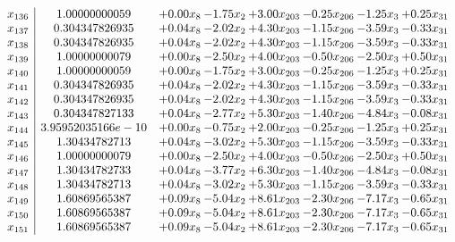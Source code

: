 \documentclass[8pt]{article}
\begin{document}
\[\begin{array}{c| c c@{\hskip 2pt} c@{\hskip 2pt} c@{\hskip 2pt} c@{\hskip 2pt} c@{\hskip 2pt} c@{\hskip 2pt} }
 x_{136}   &  1.00000000059 & +  0.00 x_{8} & -1.75 x_{2} & +  3.00 x_{203} & -0.25 x_{206} & -1.25 x_{3} & +  0.25 x_{31}\\
 x_{137}   &  0.304347826935 & +  0.04 x_{8} & -2.02 x_{2} & +  4.30 x_{203} & -1.15 x_{206} & -3.59 x_{3} & -0.33 x_{31}\\
 x_{138}   &  0.304347826935 & +  0.04 x_{8} & -2.02 x_{2} & +  4.30 x_{203} & -1.15 x_{206} & -3.59 x_{3} & -0.33 x_{31}\\
 x_{139}   &  1.00000000079 & +  0.00 x_{8} & -2.50 x_{2} & +  4.00 x_{203} & -0.50 x_{206} & -2.50 x_{3} & +  0.50 x_{31}\\
 x_{140}   &  1.00000000059 & +  0.00 x_{8} & -1.75 x_{2} & +  3.00 x_{203} & -0.25 x_{206} & -1.25 x_{3} & +  0.25 x_{31}\\
 x_{141}   &  0.304347826935 & +  0.04 x_{8} & -2.02 x_{2} & +  4.30 x_{203} & -1.15 x_{206} & -3.59 x_{3} & -0.33 x_{31}\\
 x_{142}   &  0.304347826935 & +  0.04 x_{8} & -2.02 x_{2} & +  4.30 x_{203} & -1.15 x_{206} & -3.59 x_{3} & -0.33 x_{31}\\
 x_{143}   &  0.304347827133 & +  0.04 x_{8} & -2.77 x_{2} & +  5.30 x_{203} & -1.40 x_{206} & -4.84 x_{3} & -0.08 x_{31}\\
 x_{144}   &  3.95952035166e-10 & +  0.00 x_{8} & -0.75 x_{2} & +  2.00 x_{203} & -0.25 x_{206} & -1.25 x_{3} & +  0.25 x_{31}\\
 x_{145}   &  1.30434782713 & +  0.04 x_{8} & -3.02 x_{2} & +  5.30 x_{203} & -1.15 x_{206} & -3.59 x_{3} & -0.33 x_{31}\\
 x_{146}   &  1.00000000079 & +  0.00 x_{8} & -2.50 x_{2} & +  4.00 x_{203} & -0.50 x_{206} & -2.50 x_{3} & +  0.50 x_{31}\\
 x_{147}   &  1.30434782733 & +  0.04 x_{8} & -3.77 x_{2} & +  6.30 x_{203} & -1.40 x_{206} & -4.84 x_{3} & -0.08 x_{31}\\
 x_{148}   &  1.30434782713 & +  0.04 x_{8} & -3.02 x_{2} & +  5.30 x_{203} & -1.15 x_{206} & -3.59 x_{3} & -0.33 x_{31}\\
 x_{149}   &  1.60869565387 & +  0.09 x_{8} & -5.04 x_{2} & +  8.61 x_{203} & -2.30 x_{206} & -7.17 x_{3} & -0.65 x_{31}\\
 x_{150}   &  1.60869565387 & +  0.09 x_{8} & -5.04 x_{2} & +  8.61 x_{203} & -2.30 x_{206} & -7.17 x_{3} & -0.65 x_{31}\\
 x_{151}   &  1.60869565387 & +  0.09 x_{8} & -5.04 x_{2} & +  8.61 x_{203} & -2.30 x_{206} & -7.17 x_{3} & -0.65 x_{31}\\

\end{array}\]
\end{document}
